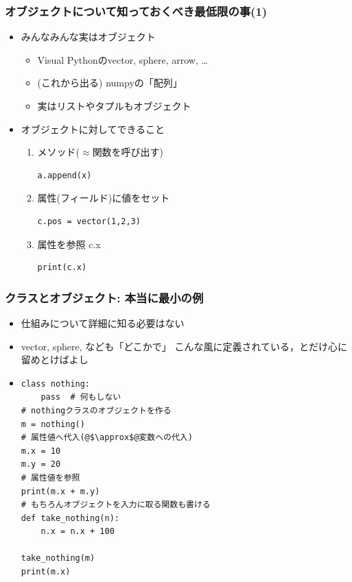 \documentclass[10pt,dvipdfmx]{beamer}
\begin{document}
\begin{frame}[fragile]
\frametitle{オブジェクトについて知っておくべき最低限の事(1)}

\begin{itemize}
\item みんなみんな実はオブジェクト
  \begin{itemize}
  \item Visual Pythonのvector, sphere, arrow, \ldots
  \item (これから出る) numpyの「配列」
  \item 実はリストやタプルもオブジェクト
  \end{itemize}
\item オブジェクトに対してできること
  \begin{enumerate}
  \item メソッド($\approx$関数を呼び出す) 
\begin{lstlisting}
a.append(x)
\end{lstlisting}
  \item 属性(フィールド)に値をセット 
\begin{lstlisting}
c.pos = vector(1,2,3)
\end{lstlisting}
  \item 属性を参照 c.x
\begin{lstlisting}
print(c.x)
\end{lstlisting}
\end{enumerate}
\end{itemize}
\end{frame}



\begin{frame}[fragile]
\frametitle{クラスとオブジェクト: 本当に最小の例}
\begin{itemize}
\item 仕組みについて詳細に知る必要はない
\item vector, sphere, なども「どこかで」
  こんな風に定義されている，とだけ心に留めとけばよし
\item []
\begin{lstlisting}
class nothing:
    pass  # 何もしない
# nothingクラスのオブジェクトを作る
m = nothing()
# 属性値へ代入(@$\approx$@変数への代入)
m.x = 10
m.y = 20
# 属性値を参照
print(m.x + m.y)
# もちろんオブジェクトを入力に取る関数も書ける
def take_nothing(n):
    n.x = n.x + 100

take_nothing(m)
print(m.x)
\end{lstlisting}
\end{itemize}
\end{frame}
\end{document}
